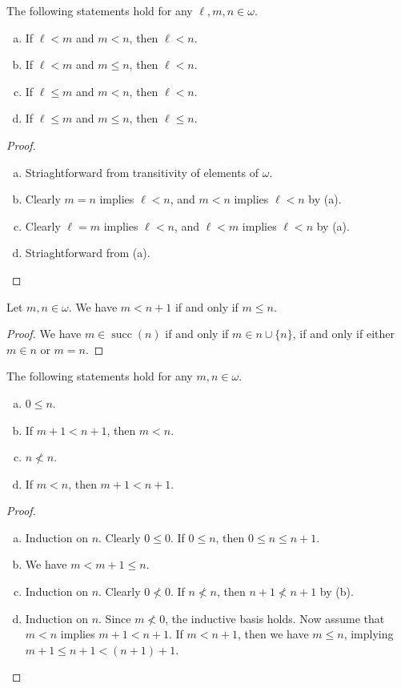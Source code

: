 \documentclass[11pt]{article}
\DeclareMathOperator{\suc}{succ}
\begin{document}
\begin{proposition}
  The following statements hold for any $\ell, m, n \in \omega$.
  \begin{enumerate}[(a)]
    \item If $\ell < m$ and $m < n$, then $\ell < n$.
    \item If $\ell < m$ and $m \leq n$, then $\ell < n$.
    \item If $\ell \leq m$ and $m < n$, then $\ell < n$.
    \item If $\ell \leq m$ and $m \leq n$, then $\ell \leq n$.
  \end{enumerate}
\end{proposition}
\begin{proof}
  \leavevmode
  \begin{enumerate}[(a)]
    \item Striaghtforward from transitivity of elements of $\omega$.
    \item Clearly $m = n$ implies $\ell < n$, and $m < n$ implies $\ell < n$ by (a).
    \item Clearly $\ell = m$ implies $\ell < n$, and $\ell < m$ implies $\ell < n$ by (a).
    \item Striaghtforward from (a).
    \qedhere
  \end{enumerate}
\end{proof}

\begin{proposition}
  Let $m, n \in \omega$.
  We have $m < n + 1$ if and only if $m \leq n$.
\end{proposition}
\begin{proof}
  We have $m \in \suc(n)$ if and only if $m \in n \cup \{n\}$, if and only if either $m \in n$ or $m = n$.
\end{proof}

\begin{proposition}
  The following statements hold for any $m, n \in \omega$.
  \begin{enumerate}[(a)]
    \item $0 \leq n$.
    \item If $m + 1 < n + 1$, then $m < n$.
    \item $n \not < n$.
    \item If $m < n$, then $m + 1 < n + 1$.
  \end{enumerate}
\end{proposition}
\begin{proof}
  \leavevmode
  \begin{enumerate}[(a)]
    \item Induction on $n$.
    Clearly $0 \leq 0$.
    If $0 \leq n$, then $0 \leq n \leq n + 1$.
    \item We have $m < m + 1 \leq n$.
    \item Induction on $n$.
    Clearly $0 \not < 0$.
    If $n \not < n$, then $n + 1 \not < n + 1$ by (b).
    \item Induction on $n$.
    Since $m \not < 0$, the inductive basis holds.
    Now assume that $m < n$ implies $m + 1 < n + 1$.
    If $m < n + 1$, then we have $m \leq n$, implying $m + 1 \leq n + 1 < (n + 1) + 1$.
    \qedhere
  \end{enumerate}
\end{proof}
\end{document}
